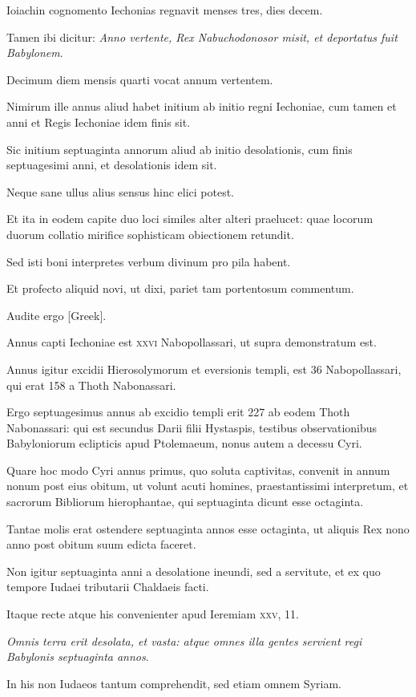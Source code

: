 \begin{parnumbers}
Ioiachin cognomento Iechonias regnavit menses tres,
dies decem.

Tamen ibi dicitur: \textit{Anno vertente, Rex Nabuchodonosor
misit, et deportatus fuit Babylonem}.

Decimum diem mensis quarti
vocat annum vertentem.

Nimirum ille annus aliud habet initium
ab initio regni Iechoniae, cum tamen et anni et Regis Iechoniae
idem finis sit.

Sic initium septuaginta annorum aliud ab initio desolationis,
cum finis septuagesimi anni, et desolationis idem sit.

Neque sane ullus alius sensus hinc elici potest.

Et ita in eodem capite
duo loci similes alter alteri praelucet: quae locorum duorum
collatio mirifice sophisticam obiectionem retundit.

Sed isti boni
interpretes verbum divinum pro pila habent.

Et profecto aliquid
novi, ut dixi, pariet tam portentosum commentum.

Audite
ergo \textgreek{[Greek]}.

Annus capti Iechoniae est \textsc{xxvi} Nabopollassari,
ut supra demonstratum est.

Annus igitur excidii Hierosolymorum
et eversionis templi, est 36 Nabopollassari, qui erat 158 a
Thoth Nabonassari.

Ergo septuagesimus annus ab excidio templi
erit 227 ab eodem Thoth Nabonassari: qui est secundus Darii filii
Hystaspis, testibus observationibus Babyloniorum eclipticis apud
Ptolemaeum, nonus autem a decessu Cyri.

Quare hoc modo
Cyri annus primus, quo soluta captivitas, convenit in annum
nonum post eius obitum, ut volunt acuti homines, praestantissimi
interpretum, et sacrorum Bibliorum hierophantae, qui septuaginta
dicunt esse octaginta.

Tantae molis erat ostendere septuaginta
annos esse octaginta, ut aliquis Rex nono anno post obitum
suum edicta faceret.

Non igitur septuaginta anni a desolatione
ineundi, sed a servitute, et ex quo tempore Iudaei tributarii
Chaldaeis facti.

Itaque recte atque his convenienter apud Ieremiam
\textsc{xxv}, 11.

\textit{Omnis terra erit desolata, et vasta: atque omnes
illa gentes servient regi Babylonis septuaginta annos}.

In his non Iudaeos
tantum comprehendit, sed etiam omnem Syriam.


\end{parnumbers}

